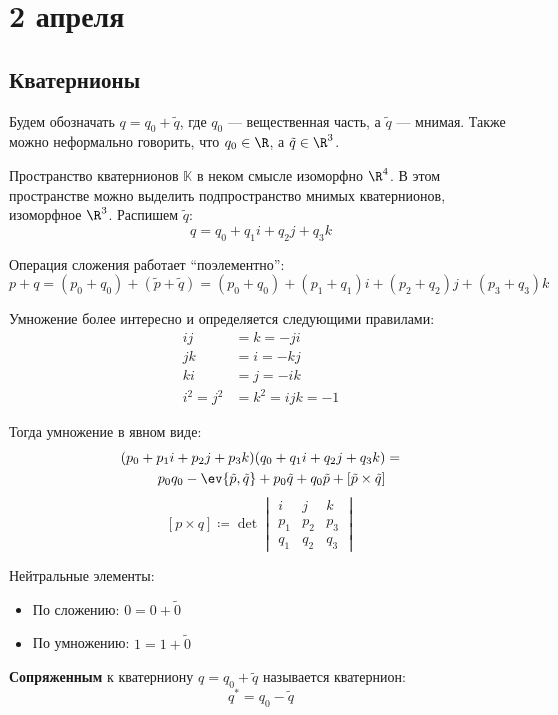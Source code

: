 \chapter{2 апреля}

\section{Кватернионы}

Будем обозначать $q = q_0 + \tilde{q}$, где $q_0$ --- вещественная часть, а $\tilde{q}$ --- мнимая.
Также можно неформально говорить, что $q_0 \in \R$, а $\tilde{q} \in \R^3$.

Пространство кватернионов $\mathbb{K}$ в неком смысле изоморфно $\R^4$.
В этом пространстве можно выделить подпространство мнимых кватернионов, изоморфное $\R^3$.
Распишем $\tilde{q}$:
\[q = q_0 + q_1 i + q_2 j + q_3 k\]

Операция сложения работает ``поэлементно'':
\[p + q = (p_0 + q_0) + (\tilde{p} + \tilde{q}) = (p_0 + q_0) + (p_1 + q_1)i + (p_2 + q_2)j + (p_3 + q_3)k\]

Умножение более интересно и определяется следующими правилами:
\begin{align*}
	ij        & = k = -ji        \\
	jk        & = i = -kj        \\
	ki        & = j = -ik        \\
	i^2 = j^2 & = k^2 = ijk = -1
\end{align*}

Тогда умножение в явном виде:
\begin{align*}
	(p_0 + p_1 i + p_2 j + p_3 k) (q_0 + q_1 i + q_2 j + q_3 k) & = \\
	p_0 q_0 - \ev{\tilde{p}, \tilde{q}} + p_0 \tilde{q} + q_0 \tilde{p} + [\tilde{p} \times \tilde{q}]
\end{align*}
\[
	[p \times q] \coloneqq \det \begin{vmatrix} i & j & k \\ p_1 & p_2 & p_3 \\ q_1 & q_2 & q_3 \end{vmatrix}
\]

Нейтральные элементы:
\begin{itemize}
	\item По сложению: $0 = 0 + \tilde{0}$
	\item По умножению: $1 = 1 + \tilde{0}$
\end{itemize}

\begin{definition}
	\textbf{Сопряженным} к кватерниону $q = q_0 + \tilde{q}$ называется кватернион:
	\[q^* = q_0 - \tilde{q}\]
\end{definition}

